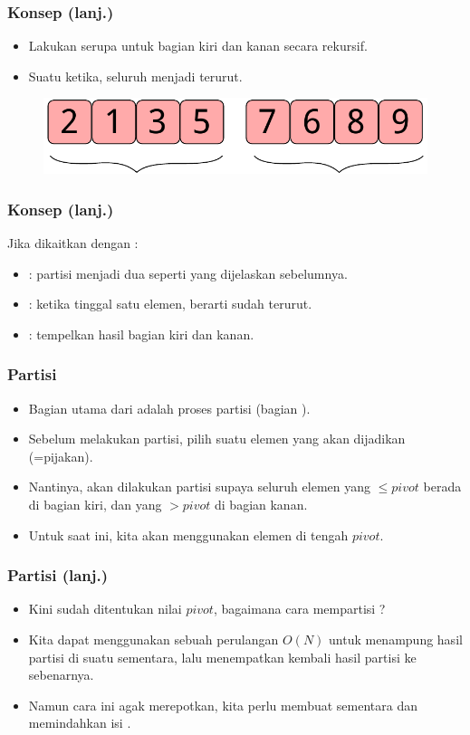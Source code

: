\begin{frame}
\frametitle{Konsep (lanj.)}
\begin{itemize}
  \item Lakukan \fQuickSort serupa untuk bagian kiri dan kanan secara rekursif.
  \item Suatu ketika, seluruh \farray menjadi terurut.
\end{itemize}
\begin{figure}
  \centering
  \includegraphics[width=7 cm]{asset/quicksort-concept-3.pdf}
\end{figure}
\end{frame}

\begin{frame}
\frametitle{Konsep (lanj.)}
Jika dikaitkan dengan \fDivideAndConquer:
\begin{itemize}
  \item {}: partisi \farray menjadi dua seperti yang dijelaskan sebelumnya.
  \item {}: ketika \farray tinggal satu elemen, berarti sudah terurut.
  \item {}: tempelkan hasil \fQuickSort bagian kiri dan kanan.
\end{itemize}
\end{frame}

\begin{frame}
\frametitle{Partisi}
\begin{itemize}
  \item Bagian utama dari \fQuickSort adalah proses partisi (bagian ).
  \item Sebelum melakukan partisi, pilih suatu elemen yang akan dijadikan \fpivot (=pijakan).
  \item Nantinya, akan dilakukan partisi supaya seluruh elemen yang $\leq pivot$ berada di bagian kiri, dan yang $> pivot$ di bagian kanan.
  \item Untuk saat ini, kita akan menggunakan elemen di tengah \farray $pivot$.
\end{itemize}
\end{frame}

\begin{frame}
\frametitle{Partisi (lanj.)}
\begin{itemize}
  \item Kini sudah ditentukan nilai $pivot$, bagaimana cara mempartisi \farray?
  \item Kita dapat menggunakan sebuah perulangan $O(N)$ untuk menampung hasil partisi di suatu \farray sementara, lalu menempatkan kembali hasil partisi ke \farray sebenarnya.
  \item Namun cara ini agak merepotkan, kita perlu membuat \farray sementara dan memindahkan isi \farray.
\end{itemize}
\end{frame}

